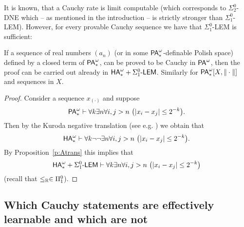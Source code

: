 It is known, that a Cauchy rate is limit computable (which corresponds 
to $\Sigma^0_2$-DNE which -- as mentioned in the introduction -- is 
strictly stronger than $\Sigma^0_1$-LEM). However, for every provable   
Cauchy sequence we have that $\Sigma^0_1$-LEM is sufficient:
\begin{prop}\label{p:limComp}
If a sequence of real numbers $(a_n)$ (or in some ${\textsf{\upshape PA}}^\omega_*$-definable Polish 
space) defined by a closed term of 
${\textsf{\upshape PA}}^\omega_*$, can be proved to be Cauchy in ${\textsf{\upshape PA}}^\omega$, then the proof can be carried 
out already in ${\textsf{\upshape HA}}^\omega_*+\Sigma^0_1\textsf{\upshape -LEM}$. Similarly for ${\textsf{\upshape PA}}^\omega_*[X,\|\cdot\|]$ and 
sequences in 
$X.$
\end{prop}
\begin{proof}
Consider a sequence $x_{(\cdot)}$ and suppose
\[ \pa_*\vdash \forall k\exists n\forall i,j>n\ 
\big(| x_i - x_j| \leq 2^{-k}\big). \]
Then by the Kuroda negative translation (see e.g. \cite{Kohlenbach08}) 
we obtain that
\[ {\textsf{\upshape HA}}^\omega_*\vdash \forall k\neg\neg\exists n\forall i,j>n\ \big(| 
x_i - x_j| \leq 2^{-k}\big). \]
By Proposition~\ref{p:Atrans} this implies that
\[ {\textsf{\upshape HA}}^\omega_*+\Sigma^0_1\textsf{\upshape -LEM}\vdash \forall k\exists n\forall i,j>n\ \big(| x_i - x_j| 
\leq 2^{-k}\big) \] (recall that $\le_{\mathbb{R}}\in\Pi^0_1$).
\end{proof}

\subsection{Which Cauchy statements are effectively learnable and which are not}

